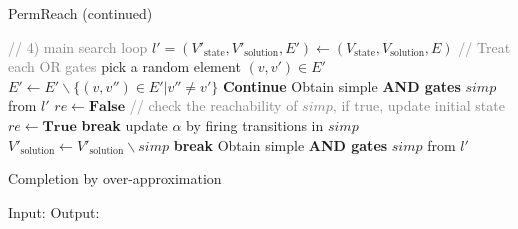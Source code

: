 \clearpage

\begin{algorithm}
  \caption{PermReach (continued)}
  \begin{algorithmic}
\State \textcolor{gray}{// 4) main search loop} %
    \State $l'=(V'_{\mathrm{state}}, V'_{\mathrm{solution}},E')\gets(V_{\mathrm{state}}, V_{\mathrm{solution}},E)$
     \textcolor{gray}{// Treat each OR gates}
        \State pick a random element $(v,v') \in E'$
        \State $E'\gets E' \backslash  \{(v,v'') \in E'| v''\neq v'\}$
    \EndFor
        \State \textbf{Continue}
    \EndIf
    \State Obtain simple \textbf{AND gates} $simp$ from $l'$
        \State $re\gets\mathbf{False}$ \textcolor{gray}{// check the reachability of $simp$, if true, update initial state}
                \State $re\gets\mathbf{True}$
                \State \textbf{break}
            \EndIf
        \EndFor
            \State update $\alpha$ by firing transitions in $simp$
            \State $V'_{\mathrm{solution}}\gets V'_{\mathrm{solution}} \backslash simp$
        \Else
            \State \textbf{break}
        \EndIf
        \State Obtain simple \textbf{AND gates} $simp$ from $l'$
    \EndWhile
    \EndIf
\EndFor %
\State {}
  \end{algorithmic}
\end{algorithm}

\begin{algorithm}[ht]
\caption{Completion by over-approximation}\label{algComOver}
\begin{algorithmic}
\State Input:
\State Output:

\end{algorithmic}
\end{algorithm}

